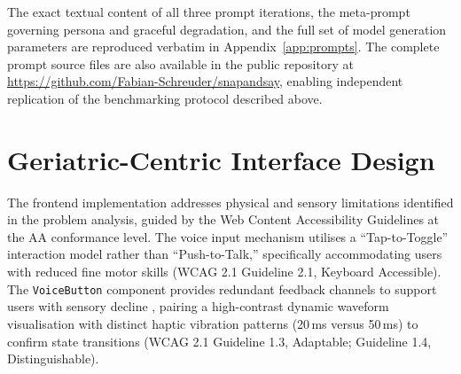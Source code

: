 The exact textual content of all three prompt iterations, the meta-prompt governing persona and graceful degradation, and the full set of model generation parameters are reproduced verbatim in Appendix~\ref{app:prompts}. The complete prompt source files are also available in the public repository at \url{https://github.com/Fabian-Schreuder/snapandsay}, enabling independent replication of the benchmarking protocol described above.

\section{Geriatric-Centric Interface Design}
\label{sec:interface-design}

The frontend implementation addresses physical and sensory limitations identified in the problem analysis, guided by the Web Content Accessibility Guidelines \citep{w3cWebContentAccessibility2023} at the AA conformance level. The voice input mechanism utilises a ``Tap-to-Toggle'' interaction model rather than ``Push-to-Talk,'' specifically accommodating users with reduced fine motor skills (WCAG 2.1 Guideline 2.1, Keyboard Accessible). The \texttt{VoiceButton} component provides redundant feedback channels to support users with sensory decline \citep{wildenbosAgingBarriersInfluencing2018}, pairing a high-contrast dynamic waveform visualisation with distinct haptic vibration patterns (20\,ms versus 50\,ms) to confirm state transitions (WCAG 2.1 Guideline 1.3, Adaptable; Guideline 1.4, Distinguishable).
